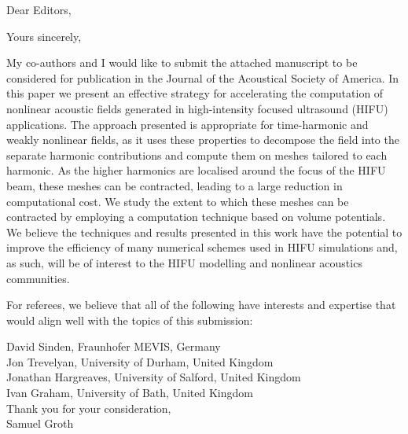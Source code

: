 \documentclass[11pt,a4paper]{moderncv}        %
\begin{document}
\date{\today}
\opening{Dear Editors,}
\closing{Yours sincerely,}

\makelettertitle

My co-authors and I would like to submit the attached manuscript to be 
considered for publication in the Journal of the Acoustical Society of America. 
In this paper we present an effective strategy for accelerating the computation
of nonlinear acoustic fields generated in high-intensity focused ultrasound (HIFU) 
applications. The approach presented is appropriate for time-harmonic and weakly 
nonlinear fields, as it uses these properties to decompose the field into the separate harmonic contributions and 
compute them on meshes tailored to each harmonic. As the higher harmonics are 
localised around the focus of the HIFU beam, these meshes can be contracted, 
leading to a large reduction in computational cost. We study the extent to which 
these meshes can be contracted by employing a computation technique based on 
volume potentials. We believe the techniques and results presented in this work 
have the potential to improve the efficiency of many numerical schemes used
in HIFU simulations and, as such, will be of interest to the HIFU modelling and 
nonlinear acoustics communities.

For referees, we believe that all of the following have interests and expertise 
that would align well with the topics of this submission:

David Sinden, Fraunhofer MEVIS, Germany \\
Jon Trevelyan, University of Durham, United Kingdom \\
Jonathan Hargreaves, University of Salford, United Kingdom \\
Ivan Graham, University of Bath, United Kingdom \\

\vspace{0.2cm}
Thank you for your consideration,\\
\vspace{0.4cm}
Samuel Groth
\end{document}
